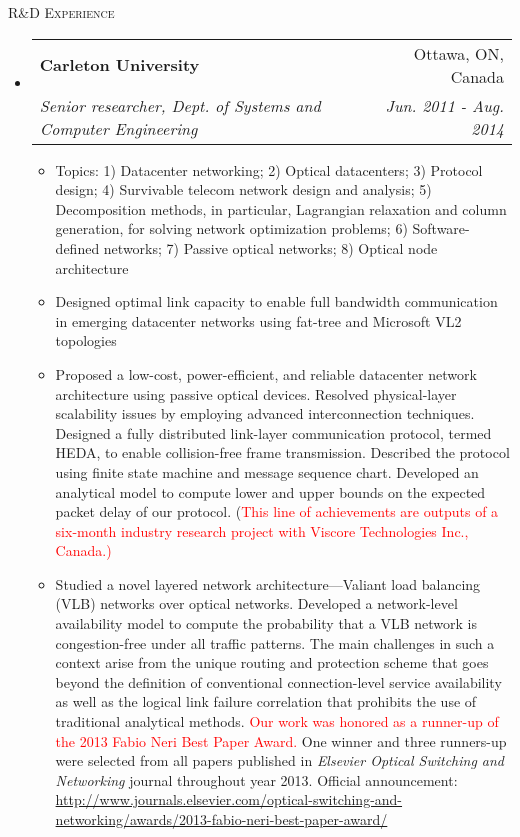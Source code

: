 \documentclass[letterpaper,11pt]{article}
\makeatletter
\newcommand{\resheading}[1]{{\noindent\large \colorbox{mygrey}{
\begin{minipage}{1.0\textwidth}{\textsc{#1 \vphantom{p\^{E}}}}\end{minipage}}}}
\newcommand{\ressubheading}[4]{
\begin{tabular*}{6.69in}{l@{\extracolsep{\fill}}r}
        \textbf{#1} & #2 \\
        \textit{#3} & \textit{#4} \\
\end{tabular*}\vspace{-6pt}
}
\newcommand{\resitem}[1]{\item #1 \vspace{-2pt}}
\makeatother
\begin{document}
\resheading{R\&D Experience}%

\begin{itemize}%
\setlength{\itemindent}{-0.075in}

\item
    \ressubheading{Carleton University}{Ottawa, ON, Canada} %
    {Senior researcher, Dept. of Systems and Computer Engineering}{Jun. 2011 - Aug. 2014} %
    \begin{itemize}
        \resitem{Topics: 1) Datacenter networking; 2) Optical datacenters; 3) Protocol design; 4) Survivable telecom network design and analysis;
        5) Decomposition methods, in particular, Lagrangian relaxation and column generation, for solving network optimization problems; 6) Software-defined networks;
        7) Passive optical networks; 8) Optical node architecture}
        \resitem{Designed optimal link capacity to enable full bandwidth communication in emerging datacenter networks using fat-tree and Microsoft VL2 topologies}
        \resitem{Proposed a low-cost, power-efficient, and reliable datacenter network architecture using passive optical devices.
        Resolved physical-layer scalability issues by employing advanced interconnection techniques.
        Designed a fully distributed link-layer communication protocol, termed HEDA, to enable collision-free frame transmission.
        Described the protocol using finite state machine and message sequence chart.
        Developed an analytical model to compute lower and upper bounds on the expected packet delay of our protocol.
        (\textcolor{Red}{This line of achievements are outputs of a six-month industry research project with Viscore Technologies Inc., Canada.)}}
        \resitem{Studied a novel layered network architecture---Valiant load balancing (VLB) networks over optical networks.
        Developed a network-level availability model to compute the probability that a VLB network is congestion-free under all traffic patterns.
        The main challenges in such a context arise from the unique routing and protection scheme that goes beyond the definition of conventional connection-level service availability
        as well as the logical link failure correlation that prohibits the use of traditional analytical methods.
        \textcolor{Red}{Our work was honored as a runner-up of the 2013 Fabio Neri Best Paper Award.}
        One winner and three runners-up were selected from all papers published in \textit{Elsevier Optical Switching and Networking} journal throughout year 2013.
        Official announcement: \url{http://www.journals.elsevier.com/optical-switching-and-networking/awards/2013-fabio-neri-best-paper-award/}}


\end{itemize}
\end{itemize}
\end{document}

